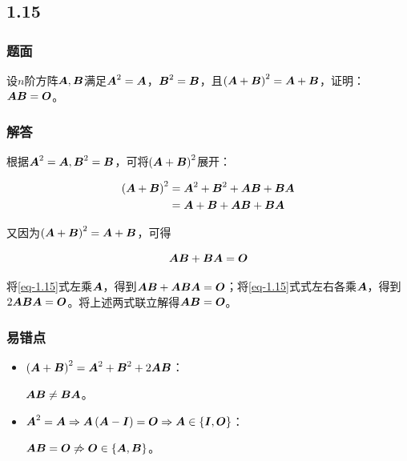 \documentclass{beamer}
\begin{document}
\subsection*{1.15}

\begin{frame}
\frametitle{题面}

设\(n\)阶方阵\(\mata,\matb\)满足\(\mata^2=\mata\)，\(\matb^2=\matb\)，且\(\mypar{\mata+\matb}^2=\mata+\matb\)，证明：\(\mata\matb=\mato\)。

\end{frame}

\begin{frame}
\frametitle{解答}

    根据\(\mata^2=\mata,\matb^2=\matb\)，可将\(\mypar{\mata+\matb}^2\)展开：

    \begin{align*}
        \mypar{\mata+\matb}^2 & =\mata^2+\matb^2+\mata\matb+\matb\mata \\
                              & =\mata+\matb+\mata\matb+\matb\mata
    \end{align*}

    又因为\(\mypar{\mata+\matb}^2=\mata+\matb\)，可得

    \begin{equation}\label{eq-1.15}
        \mata\matb+\matb\mata=\mato
    \end{equation}

    将\eqref{eq-1.15}式左乘\(\mata\)，得到\(\mata\matb+\mata\matb\mata=\mato\)；将\eqref{eq-1.15}式式左右各乘\(\mata\)，得到\(2\mata\matb\mata=\mato\)。将上述两式联立解得\(\mata\matb=\mato\)。

\end{frame}

\begin{frame}
\frametitle{易错点}

    \begin{itemize}
        \item {
              \(\mypar{\mata+\matb}^2=\mata^2+\matb^2+2\mata\matb\)：

              \(\mata\matb\neq\matb\mata\)。
              }
        \item {
              \(\mata^2=\mata\Rightarrow\mata\mypar{\mata-\mati}=\mato\Rightarrow\mata\in\setof{\mati,\mato}\)：

              \(\mata\matb=\mato\not\Rightarrow\mato\in\setof{\mata,\matb}\)。
              }
    \end{itemize}

\end{frame}
\end{document}
